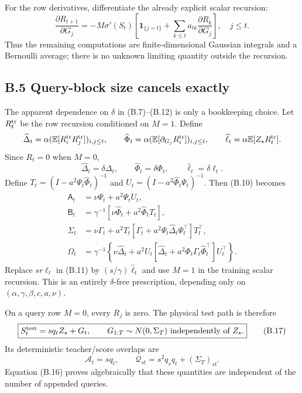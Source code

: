 \documentclass[
  11pt,
  a4paper,
]{article}
\begin{document}
For the row derivatives, differentiate the already explicit scalar
recursion: \[
\frac{\partial R_{t+1}}{\partial G_j}
=-M\sigma'(S_t)\left[\mathbf1_{\{j=t\}}
+\sum_{k\le t}a_{tk}\frac{\partial R_k}{\partial G_j}\right],\quad j\le t.
\tag{B.15}
\] Thus the remaining computations are finite-dimensional Gaussian
integrals and a Bernoulli average; there is no unknown limiting quantity
outside the recursion.

\hypertarget{b.5-query-block-size-cancels-exactly}{%
\subsection{B.5 Query-block size cancels
exactly}\label{b.5-query-block-size-cancels-exactly}}

The apparent dependence on \(\delta\) in (B.7)--(B.12) is only a
bookkeeping choice. Let \(R^{\rm tr}_t\) be the row recursion
conditioned on \(M=1\). Define \[
\widehat\Delta_t=\alpha(\mathbb E[R_i^{\rm tr}R_j^{\rm tr}])_{i,j\le t},\qquad
\widehat\Phi_t=\alpha(\mathbb E[\partial_{G_j}R_i^{\rm tr}])_{i,j\le t},
\qquad \widehat\ell_t=\alpha\mathbb E[Z_\star R_t^{\rm tr}].
\] Since \(R_t=0\) when \(M=0\), \[
\widehat\Delta_t=\delta\Delta_t,\qquad
\widehat\Phi_t=\delta\Phi_t,\qquad \widehat\ell_t=\delta\ell_t.
\] Define \(T_t=(I-a^2\Psi_t\widehat\Phi_t)^{-1}\) and
\(U_t=(I-a^2\widehat\Phi_t\Psi_t)^{-1}\). Then (B.10) becomes \[
\boxed{\begin{aligned}
\mathsf A_t&=\nu\Psi_t+a^2\Psi_tU_t,\\
\mathsf B_t&=\gamma^{-1}\left[\nu\widehat\Phi_t+a^2\widehat\Phi_tT_t\right],\\
\Sigma_t&=\nu\Gamma_t+a^2T_t\left[\Gamma_t+a^2\Psi_t\widehat\Delta_t\Psi_t^\top\right]T_t^\top,\\
\Omega_t&=\gamma^{-1}\left\{\nu\widehat\Delta_t+a^2U_t
\left[\widehat\Delta_t+a^2\widehat\Phi_t\Gamma_t\widehat\Phi_t^\top\right]U_t^\top\right\}.
\end{aligned}}
\tag{B.16}
\] Replace \(s r\ell_t\) in (B.11) by \((s/\gamma)\widehat\ell_t\) and
use \(M=1\) in the training scalar recursion. This is an entirely
\(\delta\)-free prescription, depending only on
\((\alpha,\gamma,\beta,c,a,\nu)\).

On a query row \(M=0\), every \(R_j\) is zero. The physical test path is
therefore \[
\boxed{S_t^{\rm test}=s q_tZ_\star+G_t,\qquad
G_{1:T}\sim N(0,\Sigma_T)\text{ independently of }Z_\star.}
\tag{B.17}
\] Its deterministic teacher/score overlaps are \[
\mathcal A_t=s q_t,\qquad
\mathcal Q_{st}=s^2q_sq_t+(\Sigma_T)_{st}.
\tag{B.18}
\] Equation (B.16) proves algebraically that these quantities are
independent of the number of appended queries.
\end{document}
